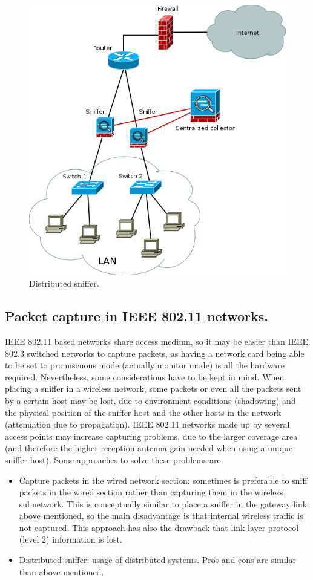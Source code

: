 \documentclass[thesis=M,english]{FITthesis}[2011/07/15]
\begin{document}
\begin{itemize}
\begin{figure}[h]
\centering
\includegraphics[scale=0.6]{images/distributed_sniffering.png}
\caption{Distributed sniffer.}
\label{fig:distributed_sniffering}
\end{figure}
\end{itemize}
\subsection{Packet capture in IEEE 802.11 networks.}
IEEE 802.11 based networks share access medium, so it may be easier than IEEE 802.3 switched networks to capture packets, as having a network card being able to be set to promiscuous mode (actually monitor mode) is all the hardware required.
Nevertheless, some considerations have to be kept in mind. When placing a sniffer in a wireless network, some packets or even all the packets sent by a certain host may be lost, due to environment conditions (shadowing) and the physical position of the sniffer host and the other hosts in the network (attenuation due to propagation). IEEE 802.11 networks made up by several access points may increase capturing problems, due to the larger coverage area (and therefore the higher reception antenna gain needed when using a unique sniffer host).
Some approaches to solve these problems are:
\begin{itemize}
\item Capture packets in the wired network section: sometimes is preferable to sniff packets in the wired section rather than capturing them in the wireless subnetwork. This is conceptually similar to place a sniffer in the gateway link above mentioned, so the main disadvantage is that internal wireless traffic is not captured. This approach has also the drawback that link layer protocol (level 2) information is lost.
\item Distributed sniffer: usage of distributed systems. Pros and cons are similar than above mentioned.
\end{itemize}
\end{document}
